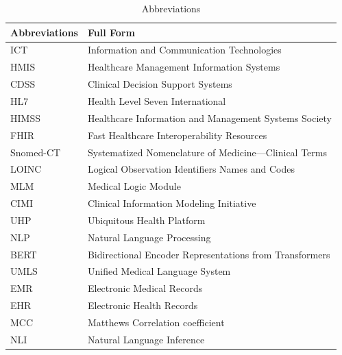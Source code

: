 \documentclass{ieeeaccess}
\begin{document}
\begin{table}[]
	\centering
	\caption{Abbreviations}
	\label{tab:abbreviations}
	\begin{tabular}{ll}
		\hline
		Abbreviations              & Full Form                                               \\ \hline
		ICT                        & Information and Communication Technologies              \\
		HMIS                       & Healthcare Management Information Systems               \\
		CDSS                       & Clinical Decision Support Systems                       \\
		HL7                        & Health Level Seven International                        \\
		HIMSS                      & Healthcare Information and Management Systems Society   \\
		FHIR                       & Fast Healthcare Interoperability Resources              \\
		Snomed-CT                  & Systematized Nomenclature of Medicine—Clinical Terms    \\
		LOINC                      & Logical Observation Identifiers Names and Codes         \\
		MLM                        & Medical Logic Module                                    \\
		CIMI                       & Clinical Information Modeling Initiative                \\
		UHP                        & Ubiquitous Health Platform                              \\
		NLP                        & Natural Language Processing                             \\
		BERT                       & Bidirectional Encoder Representations from Transformers \\
		UMLS                       & Unified Medical Language System                         \\
		EMR 					   & Electronic Medical Records                              \\
		EHR						   & Electronic Health Records                               \\
		MCC                        & Matthews Correlation coefficient                        \\
		NLI                        & Natural Language Inference                              \\ \hline
	\end{tabular}
\end{table}
\end{document}
